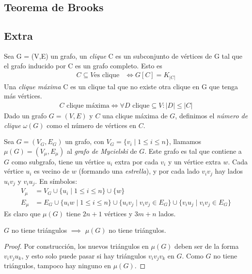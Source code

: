 \subsection{Teorema de Brooks}



\subsection{Extra}
\begin{definition}
Sea G = (V,E) un grafo, un \emph{clique} C es un subconjunto de vértices de G tal que el grafo inducido por C es un grafo completo. Esto es 
\begin{align}
    C \subseteq V \text{es clique} &\iff G[C] = K_{|C|}
\end{align}
Una \emph{clique máxima} C es un clique tal que no existe otra clique en G que tenga más vértices. \begin{align}
    C \text{ clique máxima} \iff \forall D \text{ clique} \subseteq V \colon |D| \le |C|
\end{align}
Dado un grafo $G = (V,E)$ y $C$ una clique máxima de $G$, definimos el \emph{número de clique} $\omega(G)$ como el número de vértices en $C$.
\end{definition}

\begin{definition}
Sea $G = (V_G, E_G)$ un grafo, con $V_G = \{v_i \mid 1 \le i \le n\}$, llamamos $\mu(G) = (V_\mu, E_\mu)$ al \emph{grafo de Mycielski} de $G$. Este grafo es tal que contiene a $G$ como subgrafo, tiene un vértice $u_i$ extra por cada $v_i$ y un vértice extra $w$. Cada vértice $u_i$ es vecino de $w$ (formando una \emph{estrella}), y por cada lado $v_iv_j$ hay lados $u_iv_j$ y $v_iu_j$.
En símbolos:
\begin{align}
V_\mu &= V_G \cup \{u_i \mid 1 \le i \le n \} \cup \{w\}\\
E_\mu &= E_G \cup \{ u_i w \mid 1 \le i \le n\} \cup \{u_i v_j \mid v_i v_j \in E_G \} \cup \{v_i u_j \mid v_i v_j \in E_G \}
\end{align}
Es claro que $\mu(G)$ tiene $2n+1$ vértices y $3m+n$ lados.
\end{definition}
\begin{proposition}\label{Mycielski_triangle_free}
$G$ no tiene triángulos $\implies$ $\mu(G)$ no tiene triángulos.
\end{proposition}
\begin{proof}
Por construcción, los nuevos triángulos en $\mu(G)$ deben ser de la forma $v_i v_j u_k$, y esto solo puede pasar si hay triángulos $v_i v_j v_k$ en $G$. Como $G$ no tiene triángulos, tampoco hay ninguno en $\mu(G)$.
\end{proof}

